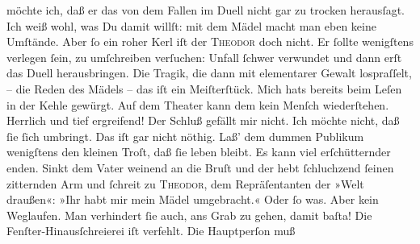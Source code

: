 \begin{ledgroupsized}[t]{13cm}
               möchte ich, daß er das von dem Fallen im Duell nicht gar zu trocken herausſagt. Ich
               weiß wohl, was Du damit willſt: mit {\pb}dem Mädel macht
               man eben keine Umſtände. Aber ſo ein roher Kerl iſt der \textsc{Theodor} doch nicht. Er ſollte wenigſtens verlegen ſein, zu umſchreiben verſuchen:
               Unfall {\dotsfour} ſchwer verwundet {\dotsfour} und
                   dann erſt das Duell herausbringen. Die Tragik,
               die dann mit elementarer Gewalt lospraſſelt, – die Reden des Mädels – das iſt ein Meiſterſtück. Mich hats bereits
               beim Leſen in der Kehle gewürgt. Auf dem Theater kann dem kein Menſch wiederſtehen.
               Herrlich und tief ergreifend! Der Schluß gefällt mir nicht. Ich möchte nicht, daß ſie ſich umbringt. Das iſt
                  {\pb}gar nicht nöthig. Laß’ dem dummen Publikum
               wenigſtens den kleinen Troſt, daß ſie leben bleibt. Es kann viel erſchütternder
               enden. Sinkt dem Vater weinend an die Bruſt und der hebt ſchluchzend ſeinen
               zitternden Arm und ſchreit zu \textsc{Theodor}, dem Repräſentanten der »Welt draußen«: »Ihr habt mir mein Mädel umgebracht.«
               Oder ſo was. Aber kein Weglaufen. Man verhindert  ſie auch, ans Grab zu gehen, damit baſta! Die Fenſter-Hinausſchreierei iſt
               verfehlt. Die Hauptperſon muß

\end{ledgroupsized}
